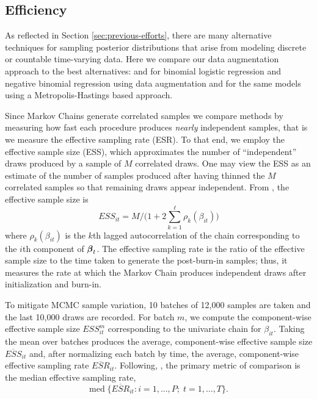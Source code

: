 

\subsection{Efficiency}

As reflected in Section \ref{sec:previous-efforts}, there are many alternative
techniques for sampling posterior distributions that arise from modeling
discrete or countable time-varying data.  Here we compare our data augmentation
approach to the best alternatives: \cite{fussl-etal-2013} and
\cite{fruhwirth-schnatter-etal-2009} for binomial logistic regression and
negative binomial regression using data augmentation and \cite{migon-etal-2013}
for the same models using a Metropolis-Hastings based approach.

Since Markov Chains generate correlated samples we compare methods by measuring
how fast each procedure produces \emph{nearly} independent samples, that is we
measure the effective sampling rate (ESR).  To that end, we employ the effective
sample size (ESS), which approximates the number of ``independent'' draws
produced by a sample of $M$ correlated draws.  One may view the ESS as an
estimate of the number of samples produced after having thinned the $M$
correlated samples so that remaining draws appear independent.  From
\citet{holmes-held-2006}, the effective sample size is
\[
ESS_{it} = M / \Big( 1 + 2 \sum_{k=1}^\ell \rho_k(\beta_{it}) \Big)
\]
where $\rho_k(\beta_{it})$ is the $k$th lagged autocorrelation of the chain
corresponding to the $i$th component of $\boldsymbol{\beta}_t$.  The effective
sampling rate is the ratio of the effective sample size to the time taken to
generate the post-burn-in samples; thus, it measures the rate at which the
Markov Chain produces independent draws after initialization and burn-in.

To mitigate MCMC sample variation, 10 batches of 12,000 samples are taken and
the last 10,000 draws are recorded.  For batch $m$, we compute the
component-wise effective sample size $ESS_{it}^{m}$ corresponding to the
univariate chain for $\beta_{it}$.  Taking the mean over batches produces the
average, component-wise effective sample size $\overline{ESS}_{it}$ and, after
normalizing each batch by time, the average, component-wise effective sampling
rate $\overline{ESR}_{it}$.  Following,
\citet{fruhwirth-schnatter-fruhwirth-2010}, the primary metric of comparison is
the median effective sampling rate,
\[
\text{med} \; \Big\{ \overline{ESR}_{it} : i=1, \ldots, P; \;  t=1, \ldots, T \Big\}.
\]


